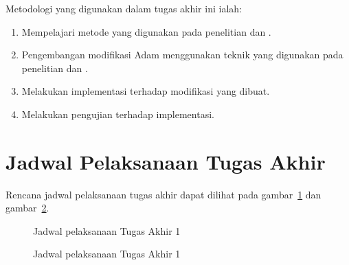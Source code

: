 Metodologi yang digunakan dalam tugas akhir ini ialah:
\begin{enumerate}
    \item Mempelajari metode yang digunakan pada penelitian \textcite{Chen2021CADA} dan \textcite{Chen2022Efficient}.
    \item Pengembangan modifikasi Adam menggunakan teknik yang digunakan pada penelitian \textcite{Chen2021CADA} dan \textcite{Chen2022Efficient}.
    \item Melakukan implementasi terhadap modifikasi yang dibuat.
    \item Melakukan pengujian terhadap implementasi.
\end{enumerate}

\section{Jadwal Pelaksanaan Tugas Akhir}

Rencana jadwal pelaksanaan tugas akhir dapat dilihat pada gambar~\ref{jadwalTA1} dan gambar~\ref{jadwalTA2}.


\begin{figure}[H]
    
    \caption{
        \label{jadwalTA1}
        Jadwal pelaksanaan Tugas Akhir 1
    }
\end{figure}

\begin{figure}[H]
    
    \caption{
        \label{jadwalTA2}
        Jadwal pelaksanaan Tugas Akhir 1
    }
\end{figure}

